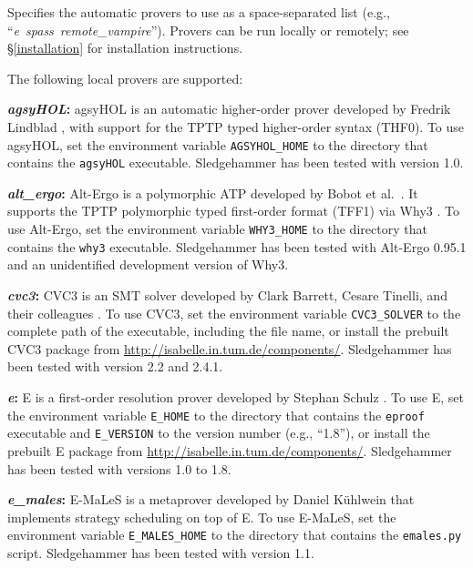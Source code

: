 \documentclass[a4paper,12pt]{article}
\newcommand\download{\url{http://isabelle.in.tum.de/components/}}
\begin{document}
\begin{enum}
Specifies the automatic provers to use as a space-separated list (e.g.,
``\textit{e}~\textit{spass}~\textit{remote\_vampire\/}'').
Provers can be run locally or remotely; see \S\ref{installation} for
installation instructions.

The following local provers are supported:

\begin{sloppy}
\begin{enum}
\item[\labelitemi] \textbf{\textit{agsyHOL}:} agsyHOL is an automatic
higher-order prover developed by Fredrik Lindblad \cite{agsyHOL},
with support for the TPTP typed higher-order syntax (THF0). To use agsyHOL, set
the environment variable \texttt{AGSYHOL\_HOME} to the directory that contains
the \texttt{agsyHOL} executable. Sledgehammer has been tested with version 1.0.

\item[\labelitemi] \textbf{\textit{alt\_ergo}:} Alt-Ergo is a polymorphic
ATP developed by Bobot et al.\ \cite{alt-ergo}.
It supports the TPTP polymorphic typed first-order format (TFF1) via Why3
\cite{why3}. To use Alt-Ergo, set the environment variable \texttt{WHY3\_HOME}
to the directory that contains the \texttt{why3} executable. Sledgehammer has
been tested with Alt-Ergo 0.95.1 and an unidentified development version of
Why3.

\item[\labelitemi] \textbf{\textit{cvc3}:} CVC3 is an SMT solver developed by
Clark Barrett, Cesare Tinelli, and their colleagues \cite{cvc3}. To use CVC3,
set the environment variable \texttt{CVC3\_SOLVER} to the complete path of the
executable, including the file name, or install the prebuilt CVC3 package from
\download. Sledgehammer has been tested with version 2.2 and 2.4.1.

\item[\labelitemi] \textbf{\textit{e}:} E is a first-order resolution prover
developed by Stephan Schulz \cite{schulz-2002}. To use E, set the environment
variable \texttt{E\_HOME} to the directory that contains the \texttt{eproof}
executable and \texttt{E\_VERSION} to the version number (e.g., ``1.8''), or
install the prebuilt E package from \download. Sledgehammer has been tested with
versions 1.0 to 1.8.

\item[\labelitemi] \textbf{\textit{e\_males}:} E-MaLeS is a metaprover developed
by Daniel K\"uhlwein that implements strategy scheduling on top of E. To use
E-MaLeS, set the environment variable \texttt{E\_MALES\_HOME} to the directory
that contains the \texttt{emales.py} script. Sledgehammer has been tested with
version 1.1.


\end{enum}
\end{sloppy}
\end{enum}
\end{document}
